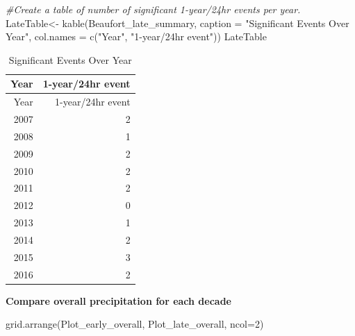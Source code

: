 \documentclass[
  12pt,
]{article}
\newenvironment{Shaded}{\begin{snugshade}}{\end{snugshade}}
\newcommand{\AttributeTok}[1]{\textcolor[rgb]{0.77,0.63,0.00}{#1}}
\newcommand{\CommentTok}[1]{\textcolor[rgb]{0.56,0.35,0.01}{\textit{#1}}}
\newcommand{\DecValTok}[1]{\textcolor[rgb]{0.00,0.00,0.81}{#1}}
\newcommand{\FunctionTok}[1]{\textcolor[rgb]{0.00,0.00,0.00}{#1}}
\newcommand{\NormalTok}[1]{#1}
\newcommand{\OtherTok}[1]{\textcolor[rgb]{0.56,0.35,0.01}{#1}}
\newcommand{\StringTok}[1]{\textcolor[rgb]{0.31,0.60,0.02}{#1}}
\begin{document}
\begin{Shaded}
\begin{Highlighting}[]
\CommentTok{\#Create a table of number of significant 1{-}year/24hr events per year.}
\NormalTok{LateTable}\OtherTok{\textless{}{-}} \FunctionTok{kable}\NormalTok{(Beaufort\_late\_summary, }
                  \AttributeTok{caption =} \StringTok{"Significant Events Over Year"}\NormalTok{, }
                  \AttributeTok{col.names =} \FunctionTok{c}\NormalTok{(}\StringTok{"Year"}\NormalTok{, }\StringTok{"1{-}year/24hr event"}\NormalTok{))}
\NormalTok{LateTable}
\end{Highlighting}
\end{Shaded}

\begin{longtable}[]{@{}rr@{}}
\caption{Significant Events Over Year}\tabularnewline
\toprule
Year & 1-year/24hr event \\
\midrule
\endfirsthead
\toprule
Year & 1-year/24hr event \\
\midrule
\endhead
2007 & 2 \\
2008 & 1 \\
2009 & 2 \\
2010 & 2 \\
2011 & 2 \\
2012 & 0 \\
2013 & 1 \\
2014 & 2 \\
2015 & 3 \\
2016 & 2 \\
\bottomrule
\end{longtable}

\newpage

\textbf{Compare overall precipitation for each decade}

\begin{Shaded}
\begin{Highlighting}[]
\FunctionTok{grid.arrange}\NormalTok{(Plot\_early\_overall, Plot\_late\_overall, }\AttributeTok{ncol=}\DecValTok{2}\NormalTok{)}
\end{Highlighting}
\end{Shaded}
\end{document}
